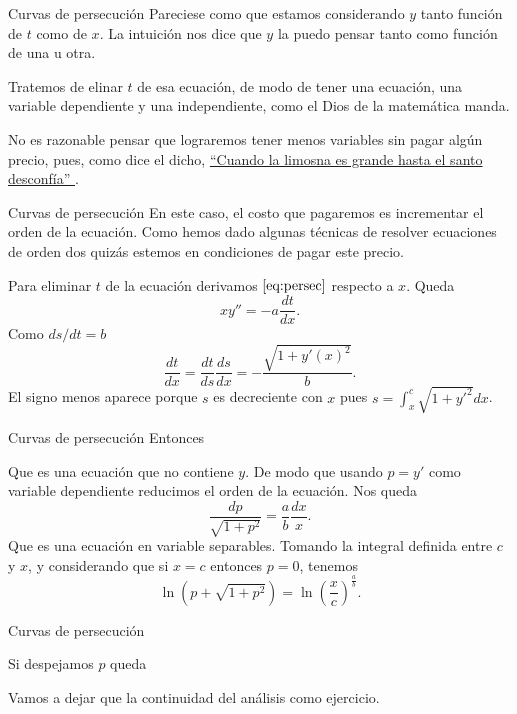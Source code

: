 \documentclass[handout,hyperref={colorlinks=true}]{beamer}
\begin{document}
\begin{frame}{Curvas de persecución}
  Pareciese como 
 que estamos considerando   $y$ tanto función de $t$ como de $x$. La intuición nos dice que $y$ la puedo pensar tanto como función de una u otra.
 
 Tratemos de elinar $t$ de esa ecuación, de modo de tener una ecuación, una variable dependiente y una independiente, como el Dios de la matemática manda.
 
  No es razonable pensar que lograremos tener menos variables sin pagar algún precio, pues, como dice el dicho, 
 \href{http://es.answers.yahoo.com/question/index?qid=20081023132736AABMX0}{``Cuando la limosna es grande hasta el santo desconfía'' }. 
\end{frame}

\begin{frame}{Curvas de persecución}
 En este caso, el costo que pagaremos 
 es incrementar el orden de la ecuación. 
 Como hemos dado algunas técnicas de  resolver ecuaciones de orden dos quizás estemos en condiciones de pagar este precio.
 
Para eliminar $t$ de la ecuación derivamos $\eqref{eq:persec}$ respecto a $x$. Queda
\[xy''=-a\frac{dt}{dx}.\]
Como $ds/dt=b$ 
\[\frac{dt}{dx}=\frac{dt}{ds}\frac{ds}{dx}=-\frac{\sqrt{1+y'(x)^2}}{b}.\]
El signo menos aparece porque $s$ es decreciente con $x$ pues $s=\int_x^c\sqrt{1+y'^2}dx$.
 
\end{frame}

\begin{frame}{Curvas de persecución}
 Entonces 
 
Que es una ecuación que no contiene $y$. De modo que usando $p=y'$ como variable dependiente reducimos el orden de la ecuación. Nos queda
\[\frac{dp}{\sqrt{1+p^2}}=\frac{a}{b}\frac{dx}{x}.\]
Que es una ecuación en variable separables. Tomando la integral definida entre $c$ y $x$, y considerando que si $x=c$ entonces $p=0$, tenemos
\[\ln\left(p+\sqrt{1+p^2}\right)=\ln\left( \frac{x}{c}\right)^{\tfrac{a}{b}}.\]
 
 
\end{frame}

\begin{frame}{Curvas de persecución}

Si despejamos $p$ queda


Vamos a dejar que la continuidad del análisis como ejercicio.
 
 
\end{frame}
\end{document}
